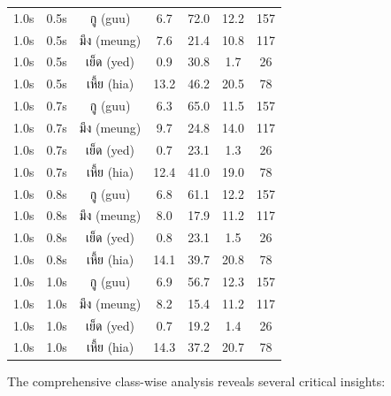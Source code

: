 \documentclass[11pt]{article}
\newcommand{\textthai}[1]{{\thaifont #1}}
\begin{document}
\begin{table}[H]
\begin{tabular}{|c|c|c|c|c|c|c|}
        \hline
        1.0s & 0.5s & \textthai{กู} (guu) & 6.7 & 72.0 & 12.2 & 157 \\
        1.0s & 0.5s & \textthai{มึง} (meung) & 7.6 & 21.4 & 10.8 & 117 \\
        1.0s & 0.5s & \textthai{เย็ด} (yed) & 0.9 & 30.8 & 1.7 & 26 \\
        1.0s & 0.5s & \textthai{เหี้ย} (hia) & 13.2 & 46.2 & 20.5 & 78 \\
        \hline
        1.0s & 0.7s & \textthai{กู} (guu) & 6.3 & 65.0 & 11.5 & 157 \\
        1.0s & 0.7s & \textthai{มึง} (meung) & 9.7 & 24.8 & 14.0 & 117 \\
        1.0s & 0.7s & \textthai{เย็ด} (yed) & 0.7 & 23.1 & 1.3 & 26 \\
        1.0s & 0.7s & \textthai{เหี้ย} (hia) & 12.4 & 41.0 & 19.0 & 78 \\
        \hline
        1.0s & 0.8s & \textthai{กู} (guu) & 6.8 & 61.1 & 12.2 & 157 \\
        1.0s & 0.8s & \textthai{มึง} (meung) & 8.0 & 17.9 & 11.2 & 117 \\
        1.0s & 0.8s & \textthai{เย็ด} (yed) & 0.8 & 23.1 & 1.5 & 26 \\
        1.0s & 0.8s & \textthai{เหี้ย} (hia) & 14.1 & 39.7 & 20.8 & 78 \\
        \hline
        1.0s & 1.0s & \textthai{กู} (guu) & 6.9 & 56.7 & 12.3 & 157 \\
        1.0s & 1.0s & \textthai{มึง} (meung) & 8.2 & 15.4 & 11.2 & 117 \\
        1.0s & 1.0s & \textthai{เย็ด} (yed) & 0.7 & 19.2 & 1.4 & 26 \\
        1.0s & 1.0s & \textthai{เหี้ย} (hia) & 14.3 & 37.2 & 20.7 & 78 \\
        \hline
    \end{tabular}
\end{table}

The comprehensive class-wise analysis reveals several critical insights:
\end{document}
